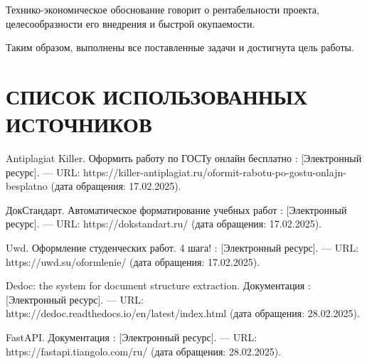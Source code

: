 \documentclass{report}
\begin{document}

Технико-экономическое обоснование говорит о рентабельности проекта, целесообразности его внедрения и быстрой окупаемости.

Таким образом, выполнены все поставленные задачи и достигнута цель
работы.




\chapter*{СПИСОК ИСПОЛЬЗОВАННЫХ ИСТОЧНИКОВ}


\begin{thebibliography}{}

Antiplagiat Killer. Оформить работу по ГОСТу онлайн бесплатно : [Электронный ресурс]. --– URL: https://killer-antiplagiat.ru/oformit-rabotu-po-gostu-onlajn-besplatno (дата обращения: 17.02.2025).
    
ДокСтандарт. Автоматическое форматирование учебных \break работ : [Электронный ресурс]. --– URL: https://dokstandart.ru/  (дата  обращения: 17.02.2025).

Uwd. Оформление студенческих работ. 4 шага! : [Электронный ресурс]. --– URL: https://uwd.su/oformlenie/ (дата обращения: 17.02.2025).


Dedoc: the system for document structure extraction. Документация : [Электронный ресурс]. --– URL: https://dedoc.readthedocs.io/en/latest/index.html (дата обращения: 28.02.2025).

FastAPI. Документация : [Электронный ресурс]. --– URL: https://fastapi.tiangolo.com/ru/ (дата обращения: 28.02.2025).


\end{thebibliography}

\newpage


\end{document}
